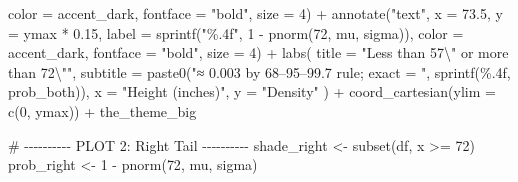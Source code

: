 \documentclass[
  letterpaper,
  DIV=11,
  numbers=noendperiod]{scrreprt}
\newenvironment{Shaded}{\begin{snugshade}}{\end{snugshade}}
\newcommand{\AttributeTok}[1]{\textcolor[rgb]{0.40,0.45,0.13}{#1}}
\newcommand{\CommentTok}[1]{\textcolor[rgb]{0.37,0.37,0.37}{#1}}
\newcommand{\DecValTok}[1]{\textcolor[rgb]{0.68,0.00,0.00}{#1}}
\newcommand{\FloatTok}[1]{\textcolor[rgb]{0.68,0.00,0.00}{#1}}
\newcommand{\FunctionTok}[1]{\textcolor[rgb]{0.28,0.35,0.67}{#1}}
\newcommand{\NormalTok}[1]{\textcolor[rgb]{0.00,0.23,0.31}{#1}}
\newcommand{\OtherTok}[1]{\textcolor[rgb]{0.00,0.23,0.31}{#1}}
\newcommand{\SpecialCharTok}[1]{\textcolor[rgb]{0.37,0.37,0.37}{#1}}
\newcommand{\StringTok}[1]{\textcolor[rgb]{0.13,0.47,0.30}{#1}}
\begin{document}
\begin{Shaded}
\begin{Highlighting}[]
           \AttributeTok{color =}\NormalTok{ accent\_dark, }\AttributeTok{fontface =} \StringTok{"bold"}\NormalTok{, }\AttributeTok{size =} \DecValTok{4}\NormalTok{) }\SpecialCharTok{+}
  \FunctionTok{annotate}\NormalTok{(}\StringTok{"text"}\NormalTok{, }\AttributeTok{x =} \FloatTok{73.5}\NormalTok{, }\AttributeTok{y =}\NormalTok{ ymax }\SpecialCharTok{*} \FloatTok{0.15}\NormalTok{, }
           \AttributeTok{label =} \FunctionTok{sprintf}\NormalTok{(}\StringTok{"\%.4f"}\NormalTok{, }\DecValTok{1} \SpecialCharTok{{-}} \FunctionTok{pnorm}\NormalTok{(}\DecValTok{72}\NormalTok{, mu, sigma)), }
           \AttributeTok{color =}\NormalTok{ accent\_dark, }\AttributeTok{fontface =} \StringTok{"bold"}\NormalTok{, }\AttributeTok{size =} \DecValTok{4}\NormalTok{) }\SpecialCharTok{+}
  \FunctionTok{labs}\NormalTok{(}
    \AttributeTok{title =} \StringTok{"Less than 57}\SpecialCharTok{\textbackslash{}"}\StringTok{ or more than 72}\SpecialCharTok{\textbackslash{}"}\StringTok{"}\NormalTok{,}
    \AttributeTok{subtitle =} \FunctionTok{paste0}\NormalTok{(}\StringTok{"≈ 0.003 by 68–95–99.7 rule; exact = "}\NormalTok{, }\FunctionTok{sprintf}\NormalTok{(}\StringTok{\textquotesingle{}\%.4f\textquotesingle{}}\NormalTok{, prob\_both)),}
    \AttributeTok{x =} \StringTok{"Height (inches)"}\NormalTok{, }\AttributeTok{y =} \StringTok{"Density"}
\NormalTok{  ) }\SpecialCharTok{+}
  \FunctionTok{coord\_cartesian}\NormalTok{(}\AttributeTok{ylim =} \FunctionTok{c}\NormalTok{(}\DecValTok{0}\NormalTok{, ymax)) }\SpecialCharTok{+}
\NormalTok{  the\_theme\_big}

\CommentTok{\# {-}{-}{-}{-}{-}{-}{-}{-}{-}{-} PLOT 2: Right Tail {-}{-}{-}{-}{-}{-}{-}{-}{-}{-}}
\NormalTok{shade\_right }\OtherTok{\textless{}{-}} \FunctionTok{subset}\NormalTok{(df, x }\SpecialCharTok{\textgreater{}=} \DecValTok{72}\NormalTok{)}
\NormalTok{prob\_right }\OtherTok{\textless{}{-}} \DecValTok{1} \SpecialCharTok{{-}} \FunctionTok{pnorm}\NormalTok{(}\DecValTok{72}\NormalTok{, mu, sigma)}


\end{Highlighting}
\end{Shaded}
\end{document}
